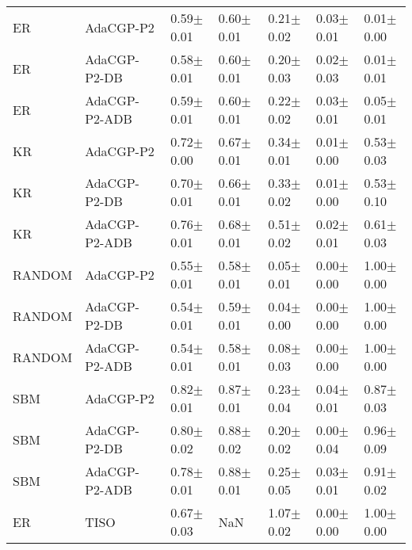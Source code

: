 \begin{tabular}{lllllll}
ER & AdaCGP-P2 & 0.59{\scriptsize$\pm$0.01} & 0.60{\scriptsize$\pm$0.01} & 0.21{\scriptsize$\pm$0.02} & 0.03{\scriptsize$\pm$0.01} & 0.01{\scriptsize$\pm$0.00} \\
ER & AdaCGP-P2-DB & 0.58{\scriptsize$\pm$0.01} & 0.60{\scriptsize$\pm$0.01} & 0.20{\scriptsize$\pm$0.03} & 0.02{\scriptsize$\pm$0.03} & 0.01{\scriptsize$\pm$0.01} \\
ER & AdaCGP-P2-ADB & 0.59{\scriptsize$\pm$0.01} & 0.60{\scriptsize$\pm$0.01} & 0.22{\scriptsize$\pm$0.02} & 0.03{\scriptsize$\pm$0.01} & 0.05{\scriptsize$\pm$0.01} \\
KR & AdaCGP-P2 & 0.72{\scriptsize$\pm$0.00} & 0.67{\scriptsize$\pm$0.01} & 0.34{\scriptsize$\pm$0.01} & 0.01{\scriptsize$\pm$0.00} & 0.53{\scriptsize$\pm$0.03} \\
KR & AdaCGP-P2-DB & 0.70{\scriptsize$\pm$0.01} & 0.66{\scriptsize$\pm$0.01} & 0.33{\scriptsize$\pm$0.02} & 0.01{\scriptsize$\pm$0.00} & 0.53{\scriptsize$\pm$0.10} \\
KR & AdaCGP-P2-ADB & 0.76{\scriptsize$\pm$0.01} & 0.68{\scriptsize$\pm$0.01} & 0.51{\scriptsize$\pm$0.02} & 0.02{\scriptsize$\pm$0.01} & 0.61{\scriptsize$\pm$0.03} \\
RANDOM & AdaCGP-P2 & 0.55{\scriptsize$\pm$0.01} & 0.58{\scriptsize$\pm$0.01} & 0.05{\scriptsize$\pm$0.01} & 0.00{\scriptsize$\pm$0.00} & 1.00{\scriptsize$\pm$0.00} \\
RANDOM & AdaCGP-P2-DB & 0.54{\scriptsize$\pm$0.01} & 0.59{\scriptsize$\pm$0.01} & 0.04{\scriptsize$\pm$0.00} & 0.00{\scriptsize$\pm$0.00} & 1.00{\scriptsize$\pm$0.00} \\
RANDOM & AdaCGP-P2-ADB & 0.54{\scriptsize$\pm$0.01} & 0.58{\scriptsize$\pm$0.01} & 0.08{\scriptsize$\pm$0.03} & 0.00{\scriptsize$\pm$0.00} & 1.00{\scriptsize$\pm$0.00} \\
SBM & AdaCGP-P2 & 0.82{\scriptsize$\pm$0.01} & 0.87{\scriptsize$\pm$0.01} & 0.23{\scriptsize$\pm$0.04} & 0.04{\scriptsize$\pm$0.01} & 0.87{\scriptsize$\pm$0.03} \\
SBM & AdaCGP-P2-DB & 0.80{\scriptsize$\pm$0.02} & 0.88{\scriptsize$\pm$0.02} & 0.20{\scriptsize$\pm$0.02} & 0.00{\scriptsize$\pm$0.04} & 0.96{\scriptsize$\pm$0.09} \\
SBM & AdaCGP-P2-ADB & 0.78{\scriptsize$\pm$0.01} & 0.88{\scriptsize$\pm$0.01} & 0.25{\scriptsize$\pm$0.05} & 0.03{\scriptsize$\pm$0.01} & 0.91{\scriptsize$\pm$0.02} \\
ER & TISO & 0.67{\scriptsize$\pm$0.03} & NaN & 1.07{\scriptsize$\pm$0.02} & 0.00{\scriptsize$\pm$0.00} & 1.00{\scriptsize$\pm$0.00} \\

\end{tabular}
